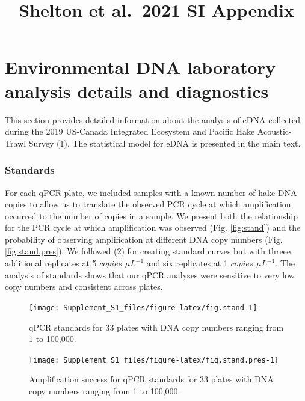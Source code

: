 \documentclass[
]{article}
\title{Shelton et al.~2021 SI Appendix}
\author{}
\date{\vspace{-2.5em}}
\begin{document}
\maketitle

{
\setcounter{tocdepth}{2}
\tableofcontents
}
\renewcommand{\thefigure}{S\arabic{figure}}
\setcounter{figure}{0}

\renewcommand{\thetable}{S\arabic{table}}
\setcounter{table}{0}

\clearpage

\hypertarget{environmental-dna-laboratory-analysis-details-and-diagnostics}{%
\section{Environmental DNA laboratory analysis details and
diagnostics}\label{environmental-dna-laboratory-analysis-details-and-diagnostics}}

This section provides detailed information about the analysis of eDNA
collected during the 2019 US-Canada Integrated Ecosystem and Pacific
Hake Acoustic-Trawl Survey (1). The statistical model for eDNA is
presented in the main text.

\hypertarget{standards}{%
\subsubsection{Standards}\label{standards}}

For each qPCR plate, we included samples with a known number of hake DNA
copies to allow us to translate the observed PCR cycle at which
amplification occurred to the number of copies in a sample. We present
both the relationship for the PCR cycle at which amplification was
observed (Fig. \ref{fig:stand}) and the probability of observing
amplification at different DNA copy numbers (Fig. \ref{fig:stand.pres}).
We followed (2) for creating standard curves but with threee additional
replicates at 5 \(copies\) \(\mu L^{-1}\) and six replicates at 1
\(copies\) \(\mu L^{-1}\). The analysis of standards shows that our qPCR
analyses were sensitive to very low copy numbers and consistent across
plates.

\begin{figure}
\texttt{[image: Supplement\_S1\_files/figure-latex/fig.stand-1]} \caption{\label{fig:stand} qPCR standards for 33 plates with DNA copy numbers ranging from 1 to 100,000.}\label{fig:fig.stand}
\end{figure}

\begin{figure}
\texttt{[image: Supplement\_S1\_files/figure-latex/fig.stand.pres-1]} \caption{\label{fig:stand.pres} Amplification success for qPCR standards for 33 plates with DNA copy numbers ranging from 1 to 100,000.}\label{fig:fig.stand.pres}
\end{figure}
\end{document}
